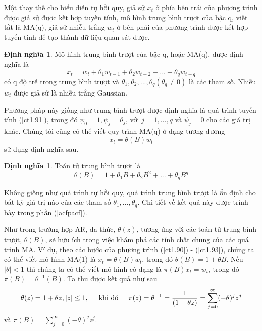 \documentclass[12pt, a4paper,oneside]{book}
\theoremstyle{definition}
\newtheorem{dn}[theo]{Định nghĩa}
\begin{document}
Một thay thế cho biểu diễn tự hồi quy, giả sử $x_{t}$ ở phía bên trái của phương trình được giả sử được kết hợp tuyến tính, mô hình trung bình trượt của bậc q, viết tắt là MA(q), giả sử nhiễu trắng $w_{t}$ ở bên phải của phương trình được kết hợp tuyến tính để tạo thành dữ liệu quan sát được.
\begin{dn} Mô hình trung bình trượt của bậc q, hoặc MA(q), được định nghĩa là 
\begin{equation}
x_{t}= w_{t}+\theta_{1}w_{t-1}+ \theta_{2}w_{t-2}+...+\theta_{q}w_{t-q} \label{ct1.100}
\end{equation}
có q độ trễ trong trung bình trượt và $\theta_{1}, \theta_{2},..., \theta_{q} (\theta_{q} \neq 0)$ là các tham số. Nhiễu $w_{t}$ được giả sử là nhiễu trắng Gaussian.

Phương pháp này giống như trung bình trượt được định nghĩa là quá trình tuyến tính (\ref{ct1.91}), trong đó $\psi_{0} = 1, \psi_{j} = \theta_{j}$, với $j = 1, ..., q$ và $ \psi_{j} = 0$ cho các giá trị khác. Chúng tôi cũng có thể viết quy trình MA(q) ở dạng tương đương
\begin{equation}
x_{t}= \theta(B)w_{t} \label{ct1.101}	\end{equation}
sử dụng định nghĩa sau.
\end{dn}
\begin{dn}
Toán tử trung bình trượt là 
\begin{equation}
\theta(B)= 1+ \theta_{1}B+\theta_{2}B^{2}+...+ \theta_{q}B^{q} \label{ct1.102}
\end{equation}	
\end{dn}

Không giống như quá trình tự hồi quy, quá trình trung bình trượt là ổn định cho bất kỳ giá trị nào của các tham số $\theta_{1}, ..., \theta_{q}$. Chi tiết về kết quả này được trình bày trong phần (\ref{acfpacf}).
	
Như trong trường hợp AR, đa thức, $\theta(z)$, tương ứng với các toán tử trung bình trượt, $\theta(B)$, sẽ hữu ích trong việc khám phá các tính chất chung của các quá trình MA. Ví dụ, theo các bước của phương trình (\ref{ct1.90}) - (\ref{ct1.93}), chúng ta có thể viết mô hình MA(1) là $x_{t} = \theta(B) w_{t}$, trong đó $\theta(B) = 1 + \theta B$. Nếu $| \theta | <1$ thì chúng ta có thể viết mô hình có dạng là $\pi (B)x_{t} = w_{t}$, trong đó $\pi(B) = \theta^{-1}(B)$. Ta thu được kết quả như sau 
$$\theta(z) = 1+\theta z, |z|\leq1, \hspace{0.5cm}\text{khi đó} \hspace{0.5cm} \pi(z) = \theta^{-1} = \dfrac{1}{(1-\theta z)}= \sum_{j=0}^{\infty}(-\theta)^{j}z^{j}$$ 
và $\pi(B)= \sum_{j=0}^{\infty}(-\theta)^{j}z^{j}$.
\end{document}
